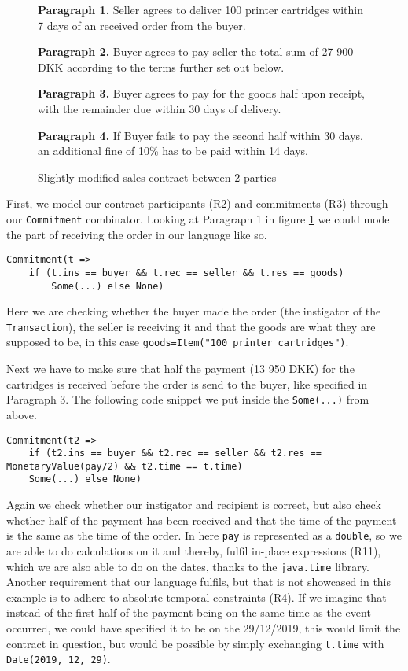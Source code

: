 \documentclass{ituthesis}
\begin{document}
\begin{figure}[!h]
    \centering
    \begin{tcolorbox}
        \textbf{Paragraph 1.} Seller agrees to deliver 100 printer cartridges within 7 days of an received order from the buyer.\par
        \textbf{Paragraph 2.} Buyer agrees to pay seller the total sum of 27 900 DKK according to the terms further set out below.\par
        \textbf{Paragraph 3.} Buyer agrees to pay for the goods half upon receipt, with the remainder due within
        30 days of delivery.\par
        \textbf{Paragraph 4.} If Buyer fails to pay the second half within 30 days, an additional fine of 10\% has
        to be paid within 14 days.\par
    \end{tcolorbox}
    \caption{Slightly modified sales contract between 2 parties \cite{hvitved2011contract}}
    \label{fig:contract}
\end{figure}

First, we model our contract participants (R2) and commitments (R3) through our \texttt{Commitment} combinator. Looking at Paragraph 1 in figure \ref{fig:contract} we could model the part of receiving the order in our language like so.
\begin{lstlisting}
Commitment(t => 
    if (t.ins == buyer && t.rec == seller && t.res == goods) 
        Some(...) else None)
\end{lstlisting}
Here we are checking whether the buyer made the order (the instigator of the \texttt{Transaction}), the seller is receiving it and that the goods are what they are supposed to be, in this case \texttt{goods=Item("100 printer cartridges")}. \par

Next we have to make sure that half the payment (13 950 DKK) for the cartridges is received before the order is send to the buyer, like specified in Paragraph 3. The following code snippet we put inside the \texttt{Some(...)} from above.
\begin{lstlisting}
Commitment(t2 =>
    if (t2.ins == buyer && t2.rec == seller && t2.res == MonetaryValue(pay/2) && t2.time == t.time)
    Some(...) else None)
\end{lstlisting}
Again we check whether our instigator and recipient is correct, but also check whether half of the payment has been received and that the time of the payment is the same as the time of the order. In here \texttt{pay} is represented as a \texttt{double}, so we are able to do calculations on it and thereby, fulfil in-place expressions (R11), which we are also able to do on the dates, thanks to the \texttt{java.time} library. Another requirement that our language fulfils, but that is not showcased in this example is to adhere to absolute temporal constraints (R4). If we imagine that instead of the first half of the payment being on the same time as the event occurred, we could have specified it to be on the 29/12/2019, this would limit the contract in question, but would be possible by simply exchanging \texttt{t.time} with \texttt{Date(2019, 12, 29)}.
\end{document}
